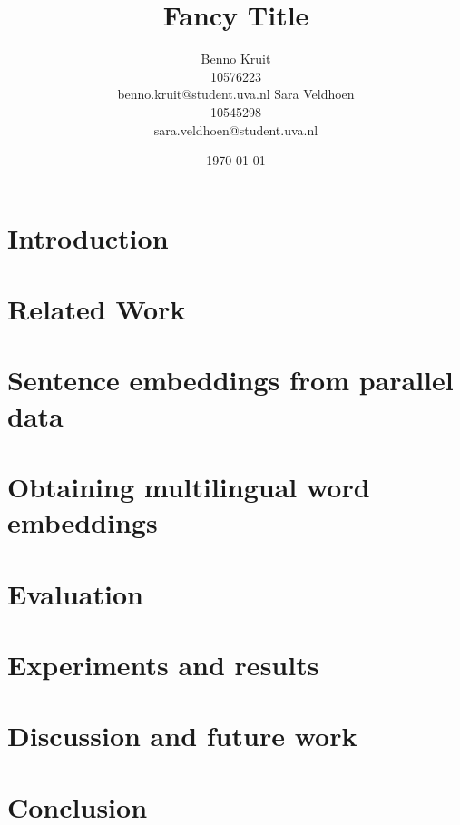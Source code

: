 \documentclass[11pt]{article}
\title{Fancy Title}
\author{Benno Kruit\\10576223\\benno.kruit@student.uva.nl\And
Sara Veldhoen\\10545298\\sara.veldhoen@student.uva.nl}
\date{\today}
\begin{document}
\maketitle



\section{Introduction}\label{s:introduction}

\section{Related Work}\label{s:relatedWork}

\section{Sentence embeddings from parallel data}\label{s:sentenceEmbeddings}

\section{Obtaining multilingual word embeddings}\label{s:wordEmbeddings}

\section{Evaluation}\label{s:evaluation}

\section{Experiments and results}\label{s:experiments}

\section{Discussion and future work}\label{s:discussion}

\section{Conclusion}\label{s:conclusion}




\end{document}
